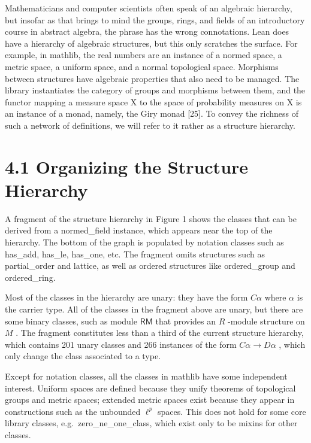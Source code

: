 \documentclass[
]{article}
\begin{document}
Mathematicians and computer scientists often speak of an algebraic
hierarchy, but insofar as that brings to mind the groups, rings, and
fields of an introductory course in abstract algebra, the phrase has the
wrong connotations. Lean does have a hierarchy of algebraic structures,
but this only scratches the surface. For example, in mathlib, the real
numbers are an instance of a normed space, a metric space, a uniform
space, and a normal topological space. Morphisms between structures have
algebraic properties that also need to be managed. The library
instantiates the category of groups and morphisms between them, and the
functor mapping a measure space X to the space of probability measures
on X is an instance of a monad, namely, the Giry monad {[}25{]}. To
convey the richness of such a network of definitions, we will refer to
it rather as a structure hierarchy.

\section{4.1 Organizing the Structure
Hierarchy}\label{organizing-the-structure-hierarchy}

A fragment of the structure hierarchy in Figure 1 shows the classes that
can be derived from a normed\_field instance, which appears near the top
of the hierarchy. The bottom of the graph is populated by notation
classes such as has\_add, has\_le, has\_one, etc. The fragment omits
structures such as partial\_order and lattice, as well as ordered
structures like ordered\_group and ordered\_ring.

Most of the classes in the hierarchy are unary: they have the form
\(C \alpha\) where \(\alpha\) is the carrier type. All of the classes in
the fragment above are unary, but there are some binary classes, such as
module \(\mathsf{R} \mathsf{M}\) that provides an \(R\) -module
structure on \(M\) . The fragment constitutes less than a third of the
current structure hierarchy, which contains 201 unary classes and 266
instances of the form \(C \alpha \to D \alpha\) , which only change the
class associated to a type.

Except for notation classes, all the classes in mathlib have some
independent interest. Uniform spaces are defined because they unify
theorems of topological groups and metric spaces; extended metric spaces
exist because they appear in constructions such as the unbounded
\(\ell^{p}\) spaces. This does not hold for some core library classes,
e.g.~zero\_ne\_one\_class, which exist only to be mixins for other
classes.
\end{document}
